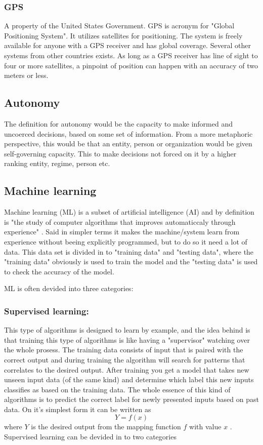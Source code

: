 \documentclass[conference]{IEEEtran}
\begin{document}
	 \subsubsection{GPS}
		 A property of the United States Government. GPS is acronym for "Global Positioning System".
		 It utilizes satellites for positioning. The system is freely available for anyone with a GPS
		 receiver and has global coverage. Several other systems from other countries exists.
		 As long as a GPS receiver has line of sight to four or more satellites, a pinpoint of
		 position can happen with an accuracy of two meters or less.

 \subsection{Autonomy}
	 The definition for autonomy would be the capacity to make informed and uncoerced decisions,
	 based on some set of information. From a more metaphoric perspective, this would be that
	 an entity, person or organization would be given self-governing capacity. This to make
	 decisions not forced on it by a higher ranking entity, regime, person etc.

 \subsection{Machine learning}
	 Machine learning (ML) is a subset of artificial intelligence (AI) and by definition is "the study of
	 computer algorithms that improves automaticcaly through experience" \cite{Wiki:ML}.
	 Said in simpler terms it makes the machine/system learn from experience without beeing explicitly
	 programmed, but to do so it need a lot of data. This data set is divided in to "training data" and
	 "testing data", where the "training data" obviously is used to train the model and the "testing data"
	 is used to check the accuracy of the model.

	 ML is often devided into three categories:
		\subsubsection{Supervised learning:}
			This type of algorithms is designed to learn by example, and the idea behind is that training this type of algorithms is like having
			a "supervisor" watching over the whole prosess. The training data consists of input that is paired with the correct output and during
			training the algorithm will search for patterns that correlates to the desired output. After training you get a model that takes new
			unseen input data (of the same kind) and determine which label this new inputs classifies as based on the training data. The whole essence
			of this kind of algorithms is to predict the correct label for newly presented inputs based on past data. On it's simplest form it can be written as
			$$ Y = f(x) $$ where $Y$ is the desired output from the mapping function $f$ with value $x$ \cite{towardsDataSience:SL}. Supervised learning can be devided in to two categories
			
\end{document}
